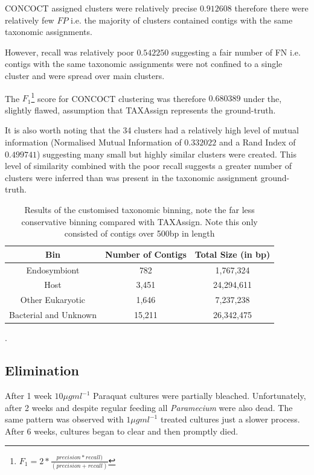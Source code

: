 CONCOCT assigned clusters were relatively precise \(0.912608\) 
therefore there were relatively few \(FP\) i.e. the majority of clusters 
contained contigs with the same taxonomic assignments. 

However, recall was relatively poor \(0.542250\) suggesting a
fair number of FN i.e. contigs with the same taxonomic assignments
were not confined to a single cluster and were spread over main clusters.

The \(F_1\)\footnote{\(F_1 = 2 * \frac{precision * recall)}{(precision + recall)}\)} score for CONCOCT 
clustering was therefore \(0.680389\) under the, slightly flawed, assumption that 
TAXAssign represents the ground-truth.

It is also worth noting that the 34 clusters had a relatively high level of mutual information
(Normalised Mutual Information of \(0.332022\) and a Rand Index of \(0.499741\)) suggesting
many small but highly similar clusters were created.  This level of similarity combined
with the poor recall suggests a greater number of clusters were inferred than was
present in the taxonomic assignment ground-truth. 

\begin{table}
    \centering
    \begin{tabular}{|c|c|c|}
        \hline
        \textbf{Bin} & \textbf{Number of Contigs} & \textbf{Total Size (in bp)} \\
        \hline
        Endosymbiont & 782 & 1,767,324\\
        Host & 3,451 &  24,294,611 \\
        \hline
        Other Eukaryotic & 1,646 & 7,237,238\\
        Bacterial and Unknown & 15,211 & 26,342,475 \\
        \hline
    \end{tabular}
    \caption[Custom Taxonomic Binning]{Results of the customised taxonomic binning,
    note the far less conservative binning compared with TAXAssign. Note this only
consisted of contigs over 500bp in length}.
\end{table}


\subsection{Elimination}

After 1 week \(10\mu g ml^{-1}\) Paraquat cultures were partially bleached. 
Unfortunately, after 2 weeks and despite regular feeding all \textit{Paramecium}
were also dead. The same pattern was observed with \(1\mu g ml^{-1}\) treated
cultures just a slower process.   After 6 weeks, cultures began to clear
and then promptly died. 

